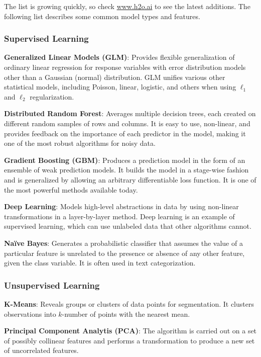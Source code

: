 The list is growing quickly, so check \url{www.h2o.ai} to see the latest additions. The following list describes some common model types and features. 

\subsubsection{Supervised Learning}
{\textbf{Generalized Linear Models (GLM)}}: Provides flexible generalization of ordinary linear regression for response variables with error distribution models other than a Gaussian (normal) distribution. GLM unifies various other statistical models, including Poisson, linear, logistic, and others when using $\ell_1$ and $\ell_2$ regularization.

{\textbf{Distributed Random Forest}}: Averages multiple decision trees, each created on different random samples of rows and columns. It is easy to use, non-linear, and provides feedback on the importance of each predictor in the model, making it one of the most robust algorithms for noisy data.

{\textbf{Gradient Boosting (GBM)}}: Produces a prediction model in the form of an ensemble of weak prediction models. It builds the model in a stage-wise fashion and is generalized by allowing an arbitrary differentiable loss function. It is one of the most powerful methods available today.

{\textbf{Deep Learning}}: Models high-level abstractions in data by using non-linear transformations in a layer-by-layer method. Deep learning is an example of supervised learning, which can use unlabeled data that other algorithms cannot.

{\textbf{Na\"{i}ve Bayes}}: Generates a probabilistic classifier that assumes the value of a particular feature is unrelated to the presence or absence of any other feature, given the class variable. It is often used in text categorization.

\subsubsection{Unsupervised Learning}
{\textbf{K-Means}}: Reveals groups or clusters of data points for segmentation. It clusters observations into $k$-number of points with the nearest mean.

{\textbf{Principal Component Analytis (PCA)}}: The algorithm is carried out on a set of possibly collinear features and performs a transformation to produce a new set of uncorrelated features.

